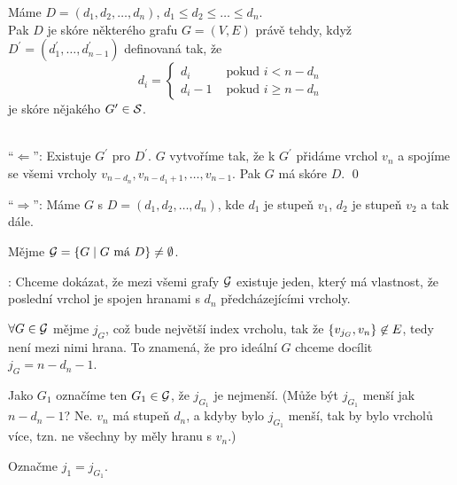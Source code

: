  Máme $D = (d_1, d_2, \dots, d_n)$, $d_1 \leq d_2 \leq \dots \leq d_n$. \\
Pak $D$ je skóre některého grafu $G = (V,E)$ právě tehdy, když $D^\prime = (d_1^\prime, \dots, d_{n-1}^\prime)$ 
definovaná tak, že
\[
    d_i = 
    \begin{cases}
        d_i &\text{ pokud } i < n-d_n \\
        d_i-1  &\text{ pokud } i \geq n-d_n
    \end{cases}
\]
je skóre nějakého $G^\prime \in \S$.

\\
\enquote{$\Leftarrow$}: Existuje $G^\prime$ pro $D^\prime$. $G$ vytvoříme tak, že k $G^\prime$ přidáme vrchol $v_n$ a 
spojíme se všemi vrcholy $v_{n-d_n}, v_{n-d_1+1}, \dots, v_{n-1}$. Pak $G$ má skóre $D$. \qed
\vspace{1em}

\enquote{$\Rightarrow$}: Máme $G$ s $D = (d_1, d_2, \dots, d_n)$, kde $d_1$ je stupeň $v_1$, $d_2$ je stupeň $v_2$ a tak 
dále.

Mějme $\G = \bc{G \mid G \text{ má } D} \not= \emptyset$.

: Chceme dokázat, že mezi všemi grafy $\G$ existuje jeden, který má vlastnost, že poslední vrchol je spojen hranami s 
$d_n$ předcházejícími vrcholy.

$\forall G \in \G$ mějme $j_G$, což bude největší index vrcholu, tak že $\bc{v_{j_G}, v_n} \not\in E$, tedy není mezi 
nimi hrana. To znamená, že pro ideální $G$ chceme docílit $j_G = n-d_n-1$.

Jako $G_1$ označíme ten $G_1 \in \G$, že $j_{G_1}$ je nejmenší. (Může být $j_{G_1}$ menší jak $n-d_n-1$? Ne. $v_n$ má 
stupeň $d_n$, a kdyby bylo $j_{G_1}$ menší, tak by bylo vrcholů více, tzn. ne všechny by měly hranu s $v_n$.)

Označme $j_1 = j_{G_1}$.

